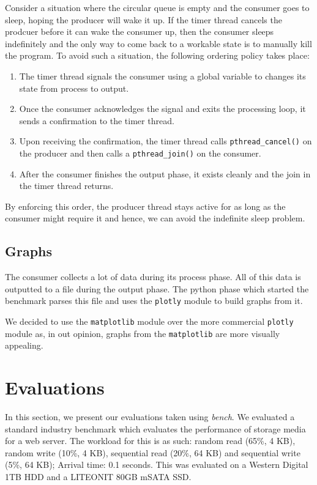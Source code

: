 \documentclass[10pt, author, twocolumn]{article}
\begin{document}
Consider a situation where the circular queue is empty and the consumer goes to sleep, hoping the producer will wake it up. If the timer thread cancels the prodcuer before it can wake the consumer up, then the consumer sleeps indefinitely and the only way to come back to a workable state is to manually kill the program. To avoid such a situation, the following ordering policy takes place:

\begin{enumerate}
    \item The timer thread signals the consumer using a global variable to changes its state from process to output. 
    \item Once the consumer acknowledges the signal and exits the processing loop, it sends a confirmation to the timer thread. 
    \item Upon receiving the confirmation, the timer thread calls \texttt{pthread\_cancel()} on the producer and then calls a \texttt{pthread\_join()} on the consumer.
    \item After the consumer finishes the output phase, it exists cleanly and the join in the timer thread returns. 
\end{enumerate}

By enforcing this order, the producer thread stays active for as long as the consumer might require it and hence, we can avoid the indefinite sleep problem. 

\subsection{Graphs}
The consumer collects a lot of data during its process phase. All of this data is outputted to a file during the output phase. The python phase which started the benchmark parses this file and uses the \texttt{plotly} module to build graphs from it.

We decided to use the \texttt{matplotlib} module over the more commercial \texttt{plotly} module as, in out opinion, graphs from the \texttt{matplotlib} are more visually appealing.

\section{Evaluations}
In this section, we present our evaluations taken using \textit{bench}. We evaluated a standard industry benchmark which evaluates the performance of storage media for a web server. The workload for this is as such: random read (65\%, 4 KB), random write (10\%, 4 KB), sequential read (20\%, 64 KB) and sequential write (5\%, 64 KB); Arrival time: 0.1 seconds. This was evaluated on a Western Digital 1TB HDD and a LITEONIT 80GB mSATA SSD.
\end{document}
